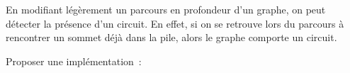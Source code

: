 \documentclass[11pt]{article}
\begin{document}
En modifiant légèrement un parcours en profondeur d'un graphe, on peut détecter la présence d'un circuit. En effet, si on se retrouve lors du parcours à rencontrer un sommet déjà dans la pile, alors le graphe comporte un circuit.

Proposer une implémentation~: 

\UPSTIcorrection{
	
}

\newpage

%
%
%
%

\end{document}
